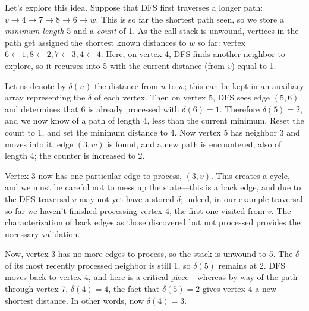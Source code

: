\documentclass{report}
\begin{document}
\begin{center}
\end{center}

Let's explore this idea. Suppose that DFS first traverses a longer path: $v\to4\to7\to8\to6\to w$. This is so far the shortest path seen, so we store a \emph{minimum length} 5 and a \emph{count} of 1. As the call stack is unwound, vertices in the path get assigned the shortest known distances to $w$ so far: vertex $6\leftarrow1; 8\leftarrow2; 7\leftarrow3; 4\leftarrow 4$. Here, on vertex 4, DFS finds another neighbor to explore, so it recurses into 5 with the current distance (from $v$) equal to 1.

Let us denote by $\delta(u)$ the distance from $u$ to $w$; this can be kept in an auxiliary array representing the $\delta$ of each vertex. Then on vertex 5, DFS sees edge $(5,6)$ and determines that 6 is already processed with $\delta(6)=1$. Therefore $\delta(5)=2$, and we now know of a path of length 4, less than the current minimum. Reset the count to 1, and set the minimum distance to 4. Now vertex 5 has neighbor 3 and moves into it; edge $(3,w)$ is found, and a new path is encountered, also of length 4; the counter is increased to 2.

Vertex 3 now has one particular edge to process, $(3,v)$. This creates a cycle, and we must be careful not to mess up the state---this is a back edge, and due to the DFS traversal $v$ may not yet have a stored $\delta$; indeed, in our example traversal so far we haven't finished processing vertex 4, the first one visited from $v$. The characterization of back edges as those discovered but not processed provides the necessary validation.

Now, vertex 3 has no more edges to process, so the stack is unwound to 5. The $\delta$ of its most recently processed neighbor is still 1, so $\delta(5)$ remains at 2. DFS moves back to vertex 4, and here is a critical piece---whereas by way of the path through vertex 7, $\delta(4)=4$, the fact that $\delta(5)=2$ gives vertex 4 a new shortest distance. In other words, now $\delta(4)=3$.
\end{document}
